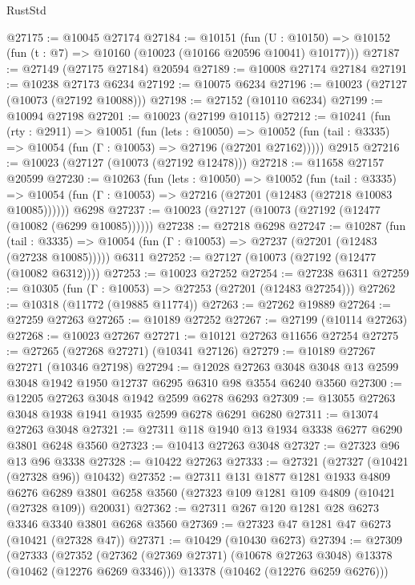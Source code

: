 \begin{lexlean}{RustStd}
\begin{coremodule}
@27175 := @10045 @27174
@27184 := @10151
    (fun (U : @10150) => @10152 (fun (t : @7) => @10160 (@10023 (@10166 @20596 @10041) @10177)))
@27187 := @27149 (@27175 @27184) @20594
@27189 := @10008 @27174 @27184
@27191 := @10238 @27173 @6234
@27192 := @10075 @6234
@27196 := @10023 (@27127 (@10073 (@27192 @10088)))
@27198 := @27152 (@10110 @6234)
@27199 := @10094 @27198
@27201 := @10023 (@27199 @10115)
@27212 := @10241
    (fun (rty : @2911) =>
    @10051
      (fun (lets : @10050) =>
      @10052 (fun (tail : @3335) => @10054 (fun (Γ : @10053) => @27196 (@27201 @27162)))))
    @2915
@27216 := @10023 (@27127 (@10073 (@27192 @12478)))
@27218 := @11658 @27157 @20599
@27230 := @10263
    (fun (lets : @10050) =>
    @10052
      (fun (tail : @3335) =>
      @10054 (fun (Γ : @10053) => @27216 (@27201 (@12483 (@27218 @10083 @10085))))))
    @6298
@27237 := @10023 (@27127 (@10073 (@27192 (@12477 (@10082 (@6299 @10085))))))
@27238 := @27218 @6298
@27247 := @10287
    (fun (tail : @3335) => @10054 (fun (Γ : @10053) => @27237 (@27201 (@12483 (@27238 @10085)))))
    @6311
@27252 := @27127 (@10073 (@27192 (@12477 (@10082 @6312))))
@27253 := @10023 @27252
@27254 := @27238 @6311
@27259 := @10305 (fun (Γ : @10053) => @27253 (@27201 (@12483 @27254)))
@27262 := @10318 (@11772 (@19885 @11774))
@27263 := @27262 @19889
@27264 := @27259 @27263
@27265 := @10189 @27252
@27267 := @27199 (@10114 @27263)
@27268 := @10023 @27267
@27271 := @10121 @27263 @11656 @27254
@27275 := @27265 (@27268 @27271) (@10341 @27126)
@27279 := @10189 @27267 @27271 (@10346 @27198)
@27294 := @12028
    @27263
    @3048
    @3048
    @13
    @2599
    @3048
    @1942
    @1950
    @12737
    @6295
    @6310
    @98
    @3554
    @6240
    @3560
@27300 := @12205 @27263 @3048 @1942 @2599 @6278 @6293
@27309 := @13055 @27263 @3048 @1938 @1941 @1935 @2599 @6278 @6291 @6280
@27311 := @13074 @27263 @3048
@27321 := @27311 @118 @1940 @13 @1934 @3338 @6277 @6290 @3801 @6248 @3560
@27323 := @10413 @27263 @3048
@27327 := @27323 @96 @13 @96 @3338
@27328 := @10422 @27263
@27333 := @27321 (@27327 (@10421 (@27328 @96)) @10432)
@27352 := @27311
    @131
    @1877
    @1281
    @1933
    @4809
    @6276
    @6289
    @3801
    @6258
    @3560
    (@27323 @109 @1281 @109 @4809 (@10421 (@27328 @109)) @20031)
@27362 := @27311 @267 @120 @1281 @28 @6273 @3346 @3340 @3801 @6268 @3560
@27369 := @27323 @47 @1281 @47 @6273 (@10421 (@27328 @47))
@27371 := @10429 (@10430 @6273)
@27394 := @27309
    (@27333
      (@27352
        (@27362 (@27369 @27371) (@10678 @27263 @3048) @13378 (@10462 (@12276 @6269 @3346)))
        @13378
        (@10462 (@12276 @6259 @6276)))

\end{coremodule}
\end{lexlean}
